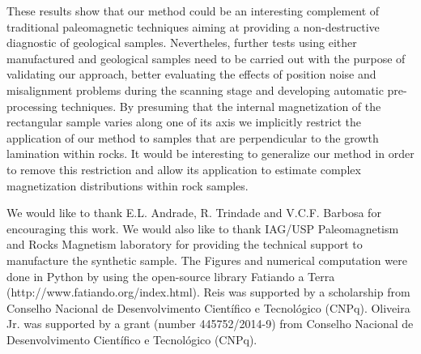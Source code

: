 \documentclass[galley,gc]{agutex}
\begin{document}
\begin{article}
These results show that our method could be an interesting complement
of traditional paleomagnetic techniques aiming at providing a 
non-destructive diagnostic of geological samples.
Nevertheles, further tests using either manufactured and geological samples 
need to be carried out with the purpose of validating our approach,
better evaluating the effects of position noise 
and misalignment problems during the scanning stage and
developing automatic pre-processing techniques.
By presuming that the internal magnetization of the rectangular 
sample varies along one of its axis we implicitly restrict the
application of our method to samples that are perpendicular
to the growth lamination within rocks.
It would be interesting to generalize our method in order to
remove this restriction and allow its application to estimate
complex magnetization distributions within rock samples.


%
%
%
%
%
%
%

\begin{acknowledgments}
We would like to thank E.L. Andrade, R. Trindade and V.C.F. Barbosa
for encouraging this work. We would also like to thank
IAG/USP Paleomagnetism and Rocks Magnetism laboratory for providing the
technical support to manufacture the synthetic sample.
The Figures and numerical computation were done in Python
by using the open-source library Fatiando a Terra 
(http://www.fatiando.org/index.html).
Reis was supported by a scholarship from Conselho Nacional 
de Desenvolvimento Cient\'{i}fico e Tecnol\'{o}gico (CNPq). 
Oliveira Jr. was supported by a grant (number 445752/2014-9)
from Conselho Nacional 
de Desenvolvimento Cient\'{i}fico e Tecnol\'{o}gico (CNPq).
\end{acknowledgments}


\end{article}
\end{document}
